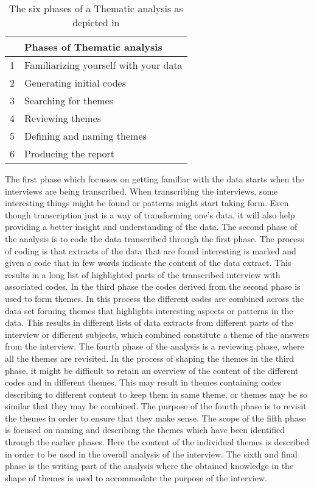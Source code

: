 \begin{table}[H]
\centering
\begin{tabular}[width=\textwidth]{cl}
\hline
& Phases of Thematic analysis \\ \hline
1 & Familiarizing yourself with your data \\
2 & Generating initial codes \\
3 & Searching for themes \\
4 & Reviewing themes \\
5 & Defining and naming themes\\
6 & Producing the report \\ \hline
\end{tabular}
\caption{The six phases of a Thematic analysis as depicted in \parencite[87]{PDF:Braun2006}}
\label{ThematicPhases}
\end{table}

\noindent
The first phase which focusses on getting familiar with the data starts when the interviews are being transcribed. When transcribing the interviews, some interesting things might be found or patterns might start taking form. Even though transcription just is a way of transforming one's data, it will also help providing a better insight and understanding of the data. The second phase of the analysis is to code the data transcribed through the first phase. The process of coding is that extracts of the data that are found interesting is marked and given a code that in few words indicate the content of the data extract. This results in a long list of highlighted parts of the transcribed interview with associated codes. In the third phase the codes derived from the second phase is used to form themes. In this process the different codes are combined across the data set forming themes that highlights interesting aspects or patterns in the data. This results in different lists of data extracts from different parts of the interview or different subjects, which combined constitute a theme of the answers from the interview. The fourth phase of the analysis is a reviewing phase, where all the themes are revisited. In the process of shaping the themes in the third phase, it might be difficult to retain an overview of the content of the different codes and in different themes. This may result in themes containing codes describing to different content to keep them in same theme, or themes may be so similar that they may be combined. The purpose of the fourth phase is to revisit the themes in order to ensure that they make sense. The scope of the fifth phase is focused on naming and describing the themes which have been identified through the earlier phases. Here the content of the individual themes is described in order to be used in the overall analysis of the interview. The sixth and final phase is the writing part of the analysis where the obtained knowledge in the shape of themes is used to accommodate the purpose of the interview.




